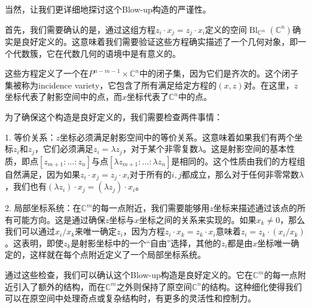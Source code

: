 当然，让我们更详细地探讨这个Blow-up构造的严谨性。

首先，我们需要确认的是，通过这组方程$z_i \cdot x_j = z_j \cdot x_i$定义的空间$\operatorname{Bl}_{\mathbb{C}^m}(\mathbb{C}^n)$确实是良好定义的。这意味着我们需要验证这些方程确实描述了一个几何对象，即一个代数簇，它在代数几何的语境中是有意义的。

这些方程定义了一个在$P^{n-m-1} \times \mathbb{C}^n$中的闭子集，因为它们是齐次的。这个闭子集被称为incidence variety，它包含了所有满足给定方程的$(x,z)$对。在这里，$z$坐标代表了射影空间中的点，而$x$坐标代表了$\mathbb{C}^n$中的点。

为了确保这个构造是良好定义的，我们需要检查两件事情：

1. 等价关系：$z$坐标必须满足射影空间中的等价关系。这意味着如果我们有两个坐标$z_i$和$z_j$，它们必须满足$z_i = \lambda z_j$，对于某个非零复数$\lambda$。这是射影空间的基本性质，即点$[z_{m+1} : \ldots : z_n]$与点$[\lambda z_{m+1} : \ldots : \lambda z_n]$是相同的。这个性质由我们的方程组自然满足，因为如果$z_i \cdot x_j = z_j \cdot x_i$对于所有的$i,j$都成立，那么对于任何非零常数$\lambda$，我们也有$(\lambda z_i) \cdot x_j = (\lambda z_j) \cdot x_i$。

2. 局部坐标系统：在$\mathbb{C}^m$的每一点附近，我们需要能够用$z$坐标来描述通过该点的所有可能方向。这是通过确保$z$坐标与$x$坐标之间的关系来实现的。如果$x_k \neq 0$，那么我们可以通过$x_i/x_k$来唯一确定$z_i$，因为方程$z_i \cdot x_k = z_k \cdot x_i$意味着$z_i = z_k \cdot (x_i/x_k)$。这表明，即使$z_k$是射影坐标中的一个“自由”选择，其他的$z_i$都是由$x$坐标唯一确定的，这样就在每个点附近定义了一个局部坐标系统。

通过这些检查，我们可以确认这个Blow-up构造是良好定义的。它在$\mathbb{C}^m$的每一点附近引入了额外的结构，而在$\mathbb{C}^m$之外则保持了原空间$\mathbb{C}^n$的结构。这种细化使得我们可以在原空间中处理奇点或复杂结构时，有更多的灵活性和控制力。

